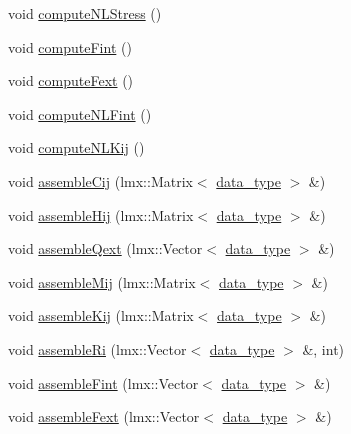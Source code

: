 \begin{DoxyCompactItemize}
\item 
void \hyperlink{classmknix_1_1_gauss_point_a36987660a0561548f737c065d0e7ccfd}{compute\-N\-L\-Stress} ()
\item 
void \hyperlink{classmknix_1_1_gauss_point_a88e2b56ce3f05d609307e858de4d52dc}{compute\-Fint} ()
\item 
void \hyperlink{classmknix_1_1_gauss_point_a7bfb2560bce7b5eb2ee9e5245e691976}{compute\-Fext} ()
\item 
void \hyperlink{classmknix_1_1_gauss_point_a6114329f1c2757b8a0628d88e9d82339}{compute\-N\-L\-Fint} ()
\item 
void \hyperlink{classmknix_1_1_gauss_point_a2b0667914f2a511167db6049616bf188}{compute\-N\-L\-Kij} ()
\item 
void \hyperlink{classmknix_1_1_gauss_point_aec8b4913cc95ba20cff54736f63f1547}{assemble\-Cij} (lmx\-::\-Matrix$<$ \hyperlink{namespacemknix_a16be4b246fbf2cceb141e3a179111020}{data\-\_\-type} $>$ \&)
\item 
void \hyperlink{classmknix_1_1_gauss_point_a1e1448cd0c3e4d5014cf1bfe21b4d166}{assemble\-Hij} (lmx\-::\-Matrix$<$ \hyperlink{namespacemknix_a16be4b246fbf2cceb141e3a179111020}{data\-\_\-type} $>$ \&)
\item 
void \hyperlink{classmknix_1_1_gauss_point_a1c39b381deef9d070fa4a28816b8bb2f}{assemble\-Qext} (lmx\-::\-Vector$<$ \hyperlink{namespacemknix_a16be4b246fbf2cceb141e3a179111020}{data\-\_\-type} $>$ \&)
\item 
void \hyperlink{classmknix_1_1_gauss_point_a62f27768cbdfa9df3c88444b0f270fcf}{assemble\-Mij} (lmx\-::\-Matrix$<$ \hyperlink{namespacemknix_a16be4b246fbf2cceb141e3a179111020}{data\-\_\-type} $>$ \&)
\item 
void \hyperlink{classmknix_1_1_gauss_point_ae995cf148587ed806ad440421c9c0130}{assemble\-Kij} (lmx\-::\-Matrix$<$ \hyperlink{namespacemknix_a16be4b246fbf2cceb141e3a179111020}{data\-\_\-type} $>$ \&)
\item 
void \hyperlink{classmknix_1_1_gauss_point_a750508df5aa985421babfed3135fe1f5}{assemble\-Ri} (lmx\-::\-Vector$<$ \hyperlink{namespacemknix_a16be4b246fbf2cceb141e3a179111020}{data\-\_\-type} $>$ \&, int)
\item 
void \hyperlink{classmknix_1_1_gauss_point_af42b26bb5560437cd24a05a6ec5a12df}{assemble\-Fint} (lmx\-::\-Vector$<$ \hyperlink{namespacemknix_a16be4b246fbf2cceb141e3a179111020}{data\-\_\-type} $>$ \&)
\item 
void \hyperlink{classmknix_1_1_gauss_point_a95ea27055e2b71b521b5d5e500cdcc42}{assemble\-Fext} (lmx\-::\-Vector$<$ \hyperlink{namespacemknix_a16be4b246fbf2cceb141e3a179111020}{data\-\_\-type} $>$ \&)

\end{DoxyCompactItemize}

